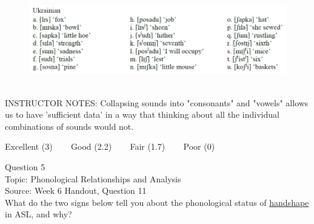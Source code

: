 \documentclass[12pt]{article}
\begin{document}
\begin{figure}[H]
\includegraphics{../images/ukrainian.png}
\end{figure}

~\\
INSTRUCTOR NOTES: Collapsing sounds into "consonants" and "vowels" allows us to have 'sufficient data' in a way that thinking about all the individual combinations of sounds would not.


\vfill
Excellent (3) ~~~ Good (2.2) ~~~ Fair (1.7) ~~~ Poor (0)
\newpage

{\large Question 5}\\

Topic: Phonological Relationships and Analysis\\
Source: Week 6 Handout, Question 11\\

What do the two signs below tell you about the phonological status of \underline{handshape} in ASL, and why?\\
\end{document}
